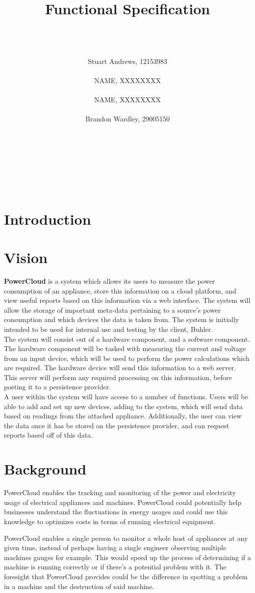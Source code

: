 \documentclass{article}
\title{Functional Specification}
\author
{  
	\\\\\\
	Stuart Andrews, 12153983 
	\\\\
	NAME, XXXXXXXX
	\\\\
	NAME, XXXXXXXX 
	\\\\
	Brandon Wardley, 29005150 
	\\\\\\\\\\\\\\
}
\begin{document}
\maketitle
\thispagestyle{empty}
\newpage
\tableofcontents
\newpage

\section{Introduction}
\section{Vision}
\textbf{PowerCloud} is a system which allows its users to measure the power consumption of an appliance, store this information on a cloud platform, and view useful reports based on this information via a web interface. The system will allow the storage of important meta-data pertaining to a source's power consumption and which devices the data is taken from. The system is initially intended to be used for internal use and testing by the client, Buhler.\\

The system will consist out of a hardware component, and a software component. The hardware component will be tasked with measuring the current and voltage from an input device, which will be used to perform the power calculations which are required. The hardware device will send this information to a web server. This server will perform any required processing on this information, before posting it to a persistence provider.\\

A user within the system will have access to a number of functions. Users will be able to add and set up new devices, adding to the system, which will send data based on readings from the attached appliance. Additionally, the user can view the data once it has be stored on the persistence provider, and can request reports based off of this data.

\section{Background}
PowerCloud enables the tracking and monitoring of the power and electricity 
usage of electrical appliances and machines. PowerCloud could potentially help 
businesses understand the fluctuations in energy usages and could use this 
knowledge to optimizes costs in terms of running electrical equipment.

PowerCloud enables a single person to monitor a whole host of appliances at any 
given time, instead of perhaps having a single engineer observing multiple 
machines gauges for example. This would speed up the process of determining if 
a machine is running correctly or if there's a potential problem with it. The 
foresight that PowerCloud provides could be the difference in spotting a 
problem in a machine and the destruction of said machine.
\end{document}
